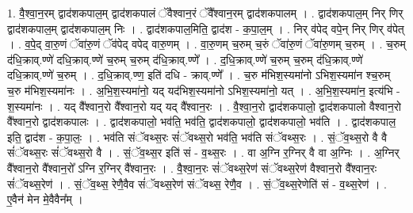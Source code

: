 \documentclass[17pt]{extarticle}
\begin{document}
1. वै॒श्वा॒न॒रम् द्वाद॑शकपाल॒म् द्वाद॑शकपालं ॅवैश्वान॒रं ॅवै᳚श्वान॒रम् द्वाद॑शकपालम् । . द्वाद॑शकपाल॒म् निर् णिर् द्वाद॑शकपाल॒म् द्वाद॑शकपाल॒म् निः । . द्वाद॑शकपाल॒मिति॒ द्वाद॑श - क॒पा॒ल॒म् । . निर् व॑पेद् वपे॒न् निर् णिर् व॑पेत् । . व॒पे॒द् वा॒रु॒णं ॅवा॑रु॒णं ॅव॑पेद् वपेद् वारु॒णम् । . वा॒रु॒णम् च॒रुम् च॒रुं ॅवा॑रु॒णं ॅवा॑रु॒णम् च॒रुम् । . च॒रुम् द॑धि॒क्राव्.ण्णे॑ दधि॒क्राव्.ण्णे॑ च॒रुम् च॒रुम् द॑धि॒क्राव्.ण्णे᳚ । . द॒धि॒क्राव्.ण्णे॑ च॒रुम् च॒रुम् द॑धि॒क्राव्.ण्णे॑ दधि॒क्राव्.ण्णे॑ च॒रुम् । . द॒धि॒क्राव्.ण्ण॒ इति॑ दधि - क्राव्.ण्णे᳚ । . च॒रु म॑भिश॒स्यमा॑नो ऽभिश॒स्यमा॑न श्च॒रुम् च॒रु म॑भिश॒स्यमा॑नः । . अ॒भि॒श॒स्यमा॑नो॒ यद् यद॑भिश॒स्यमा॑नो ऽभिश॒स्यमा॑नो॒ यत् । . अ॒भि॒श॒स्यमा॑न॒ इत्य॑भि - श॒स्यमा॑नः । . यद् वै᳚श्वान॒रो वै᳚श्वान॒रो यद् यद् वै᳚श्वान॒रः । . वै॒श्वा॒न॒रो द्वाद॑शकपालो॒ द्वाद॑शकपालो वैश्वान॒रो वै᳚श्वान॒रो द्वाद॑शकपालः । . द्वाद॑शकपालो॒ भव॑ति॒ भव॑ति॒ द्वाद॑शकपालो॒ द्वाद॑शकपालो॒ भव॑ति । . द्वाद॑शकपाल॒ इति॒ द्वाद॑श - क॒पा॒लः॒ । . भव॑ति संॅवथ्स॒रः सं॑ॅवथ्स॒रो भव॑ति॒ भव॑ति संॅवथ्स॒रः । . सं॒ॅव॒थ्स॒रो वै वै सं॑ॅवथ्स॒रः सं॑ॅवथ्स॒रो वै । . सं॒ॅव॒थ्स॒र इति॑ सं - व॒थ्स॒रः । . वा अ॒ग्नि र॒ग्निर् वै वा अ॒ग्निः । . अ॒ग्निर् वै᳚श्वान॒रो वै᳚श्वान॒रो᳚ ऽग्नि र॒ग्निर् वै᳚श्वान॒रः । . वै॒श्वा॒न॒रः सं॑ॅवथ्स॒रेण॑ संॅवथ्स॒रेण॑ वैश्वान॒रो वै᳚श्वान॒रः सं॑ॅवथ्स॒रेण॑ । . सं॒ॅव॒थ्स॒ रेणै॒वैव सं॑ॅवथ्स॒रेण॑ संॅवथ्स॒ रेणै॒व । . सं॒ॅव॒थ्स॒रेणेति॑ सं - व॒थ्स॒रेण॑ । . ए॒वैन॑ मेन मे॒वैवैन᳚म् । \newline
\end{document}
